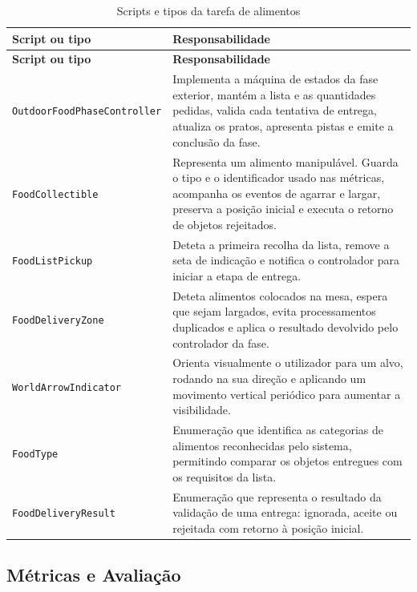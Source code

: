 \documentclass[12pt,a4paper,oneside]{report}
\begin{document}
\begin{longtable}{p{4.2cm}p{8.5cm}}
\caption{Scripts e tipos da tarefa de alimentos}
\label{tab:scripts-alimentos}\\
\toprule
\textbf{Script ou tipo} & \textbf{Responsabilidade} \\
\midrule
\endfirsthead
\toprule
\textbf{Script ou tipo} & \textbf{Responsabilidade} \\
\midrule
\endhead
\texttt{OutdoorFoodPhaseController} &
Implementa a máquina de estados da fase exterior, mantém a lista e as quantidades pedidas, valida cada tentativa de entrega, atualiza os pratos, apresenta pistas e emite a conclusão da fase. \\

\texttt{FoodCollectible} &
Representa um alimento manipulável. Guarda o tipo e o identificador usado nas métricas, acompanha os eventos de agarrar e largar, preserva a posição inicial e executa o retorno de objetos rejeitados. \\

\texttt{FoodListPickup} &
Deteta a primeira recolha da lista, remove a seta de indicação e notifica o controlador para iniciar a etapa de entrega. \\

\texttt{FoodDeliveryZone} &
Deteta alimentos colocados na mesa, espera que sejam largados, evita processamentos duplicados e aplica o resultado devolvido pelo controlador da fase. \\

\texttt{WorldArrowIndicator} &
Orienta visualmente o utilizador para um alvo, rodando na sua direção e aplicando um movimento vertical periódico para aumentar a visibilidade. \\

\texttt{FoodType} &
Enumeração que identifica as categorias de alimentos reconhecidas pelo sistema, permitindo comparar os objetos entregues com os requisitos da lista. \\

\texttt{FoodDeliveryResult} &
Enumeração que representa o resultado da validação de uma entrega: ignorada, aceite ou rejeitada com retorno à posição inicial. \\
\bottomrule
\end{longtable}

\subsection{Métricas e Avaliação}
\end{document}
